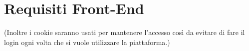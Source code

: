 \section{Requisiti Front-End}
\label{sec:RequisitiFrontEnd}


(Inoltre i cookie saranno usati per mantenere l'accesso così da evitare di fare il login ogni volta che si vuole utilizzare la piattaforma.)